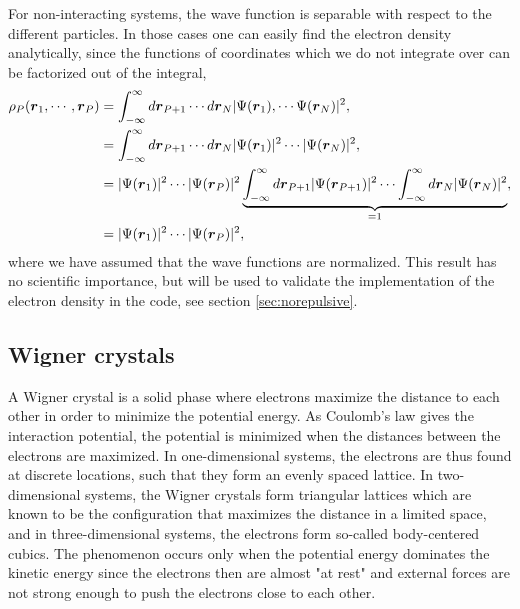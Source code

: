 For non-interacting systems, the wave function is separable with respect to the different particles. In those cases one can easily find the electron density analytically, since the functions of coordinates which we do not integrate over can be factorized out of the integral,
\begin{equation}
\begin{aligned}
\rho_P(\boldsymbol{{r}}_1,\cdots,\boldsymbol{{r}}_P)&=\int_{-\infty}^{\infty}d\boldsymbol{{r}}_{P+1}\cdots d\boldsymbol{{r}}_N |\Psi(\boldsymbol{{r}}_1),\cdots \Psi(\boldsymbol{{r}}_N)|^2,\\
&=\int_{-\infty}^{\infty}d\boldsymbol{{r}}_{P+1}\cdots d\boldsymbol{{r}}_N |\Psi(\boldsymbol{{r}}_1)|^2\cdots |\Psi(\boldsymbol{{r}}_N)|^2,\\
&=|\Psi(\boldsymbol{{r}}_1)|^2\cdots |\Psi(\boldsymbol{{r}}_P)|^2\underbrace{\int_{-\infty}^{\infty}d\boldsymbol{{r}}_{P+1}|\Psi(\boldsymbol{{r}}_{P+1})|^2\cdots\int_{-\infty}^{\infty}d\boldsymbol{{r}}_{N}|\Psi(\boldsymbol{{r}}_{N})|^2}_{=1},\\
&=|\Psi(\boldsymbol{{r}}_1)|^2\cdots |\Psi(\boldsymbol{{r}}_P)|^2,
\end{aligned}
\end{equation}
where we have assumed that the wave functions are normalized. This result has no scientific importance, but will be used to validate the implementation of the electron density in the code, see section \ref{sec:norepulsive}.

\subsection{Wigner crystals} \label{sec:wigner}
A Wigner crystal is a solid phase where electrons maximize the distance to each other in order to minimize the potential energy. As Coulomb's law gives the interaction potential, the potential is minimized when the distances between the electrons are maximized. In one-dimensional systems, the electrons are thus found at discrete locations, such that they form an evenly spaced lattice. In two-dimensional systems, the Wigner crystals form triangular lattices which are known to be the configuration that maximizes the distance in a limited space, and in three-dimensional systems, the electrons form so-called body-centered cubics. The phenomenon occurs only when the potential energy dominates the kinetic energy since the electrons then are almost "at rest" and external forces are not strong enough to push the electrons close to each other.


